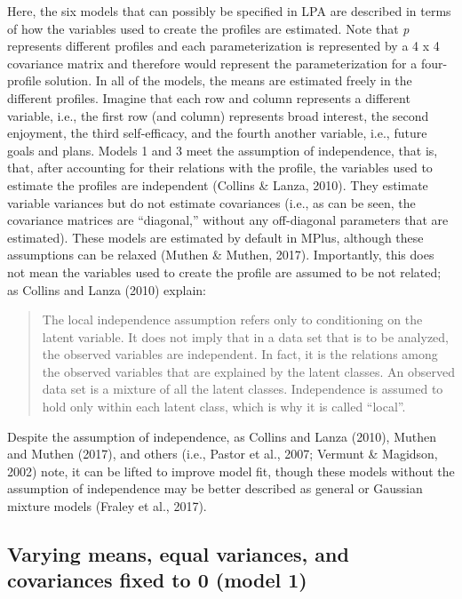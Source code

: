 \documentclass[]{msu-thesis}
\theoremstyle{definition}
\theoremstyle{definition}
\theoremstyle{definition}
\theoremstyle{remark}
\begin{document}
\begin{appendices}
Here, the six models that can possibly be specified in LPA are described
in terms of how the variables used to create the profiles are estimated.
Note that \emph{p} represents different profiles and each
parameterization is represented by a 4 x 4 covariance matrix and
therefore would represent the parameterization for a four-profile
solution. In all of the models, the means are estimated freely in the
different profiles. Imagine that each row and column represents a
different variable, i.e., the first row (and column) represents broad
interest, the second enjoyment, the third self-efficacy, and the fourth
another variable, i.e., future goals and plans. Models 1 and 3 meet the
assumption of independence, that is, that, after accounting for their
relations with the profile, the variables used to estimate the profiles
are independent (Collins \& Lanza, 2010). They estimate variable
variances but do not estimate covariances (i.e., as can be seen, the
covariance matrices are ``diagonal,'' without any off-diagonal
parameters that are estimated). These models are estimated by default in
MPlus, although these assumptions can be relaxed (Muthen \& Muthen,
2017). Importantly, this does not mean the variables used to create the
profile are assumed to be not related; as Collins and Lanza (2010)
explain:

\begin{quote}
The local independence assumption refers only to conditioning on the
latent variable. It does not imply that in a data set that is to be
analyzed, the observed variables are independent. In fact, it is the
relations among the observed variables that are explained by the latent
classes. An observed data set is a mixture of all the latent classes.
Independence is assumed to hold only within each latent class, which is
why it is called ``local''.
\end{quote}

Despite the assumption of independence, as Collins and Lanza (2010),
Muthen and Muthen (2017), and others (i.e., Pastor et al., 2007; Vermunt
\& Magidson, 2002) note, it can be lifted to improve model fit, though
these models without the assumption of independence may be better
described as general or Gaussian mixture models (Fraley et al., 2017).

\subsection{Varying means, equal variances, and covariances fixed to 0
(model
1)}\label{varying-means-equal-variances-and-covariances-fixed-to-0-model-1}


\end{appendices}
\end{document}
